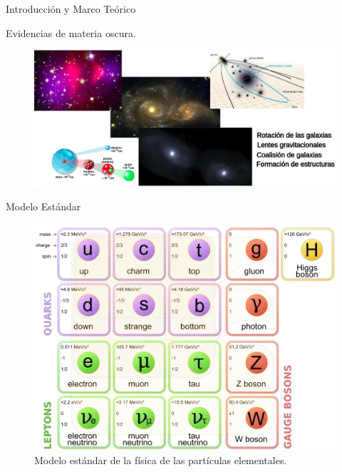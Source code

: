 \begin{frame}{}
    \begin{center}
        \LARGE Introducci\'on y Marco Te\'orico
    \end{center}
\end{frame}

\begin{frame}{Evidencias de materia oscura.}
\begin{figure}
\centering
\includegraphics[width=1\textwidth]{Imag/materia_oscura.png}
\end{figure}

\end{frame}


\begin{frame}{Modelo Est\'andar}

\begin{figure}
\centering
\includegraphics[width=.6\textwidth]{Imag/standard_model.png}
\caption{Modelo est\'andar de la f\'isica de las part\'iculas elementales.}
\end{figure}


\end{frame}




